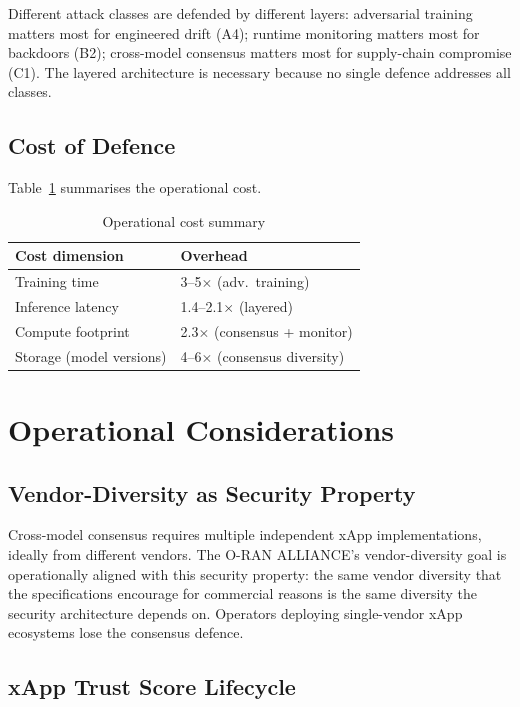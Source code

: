 \documentclass[sigconf,nonacm]{acmart}
\begin{document}
Different attack classes are defended by different layers:
adversarial training matters most for engineered drift (A4);
runtime monitoring matters most for backdoors (B2); cross-model
consensus matters most for supply-chain compromise (C1). The
layered architecture is necessary because no single defence
addresses all classes.

\subsection{Cost of Defence}

Table~\ref{tab:cost} summarises the operational cost.

\begin{table}[h]
\caption{Operational cost summary}
\label{tab:cost}
\small
\begin{tabularx}{\columnwidth}{@{}p{3.2cm}X@{}}
\toprule
\textbf{Cost dimension} & \textbf{Overhead} \\
\midrule
Training time            & 3--5$\times$ (adv.\ training) \\
Inference latency        & 1.4--2.1$\times$ (layered) \\
Compute footprint        & 2.3$\times$ (consensus + monitor) \\
Storage (model versions) & 4--6$\times$ (consensus diversity) \\
\bottomrule
\end{tabularx}
\end{table}

\section{Operational Considerations}

\subsection{Vendor-Diversity as Security Property}

Cross-model consensus requires multiple independent xApp
implementations, ideally from different vendors. The O-RAN
ALLIANCE's vendor-diversity goal is operationally aligned with
this security property: the same vendor diversity that the
specifications encourage for commercial reasons is the same
diversity the security architecture depends on. Operators
deploying single-vendor xApp ecosystems lose the consensus
defence.

\subsection{xApp Trust Score Lifecycle}
\end{document}
